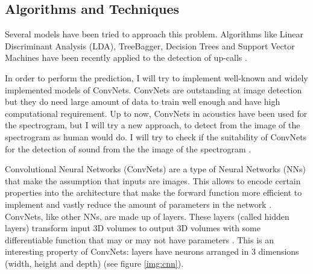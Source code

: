 \documentclass[]{article}
\begin{document}
\subsection{Algorithms and Techniques}\label{algorithms-and-techniques}

Several models have been tried to approach this problem. Algorithms like  Linear Discriminant Analysis (LDA), TreeBagger, Decision Trees and Support Vector Machines have been recently applied to the detection of up-calls \cite{Esfahanian2015}. 

In order to perform the prediction, I will try to implement well-known and widely implemented models of ConvNets. ConvNets are outstanding at image detection but they do need large amount of data to train well enough and have high computational requirement. Up to now, ConvNets in acoustics have been used for the spectrogram, but I will try a new approach, to detect from the image of the spectrogram as human would do. I will try to check if the suitability of ConvNets for the detection of sound from the the image of the spectrogram \cite{Nouriblog}.

Convolutional Neural Networks (ConvNets) are a type of Neural Networks (NNs) that make the assumption that inputs are images. This allows to encode certain properties into the architecture that make the forward function more efficient to implement and vastly reduce the amount of parameters in the network \cite{cs231convnets}.
ConvNets, like other NNs, are made up of layers. These layers (called hidden layers) transform input 3D volumes to output 3D volumes with some differentiable function that may or may not have parameters \cite{cs231convnets}. This is an interesting property of ConvNets: layers have neurons arranged in 3 dimensions (width, height and depth) (see figure \ref{img:cnn}). %
\end{document}
